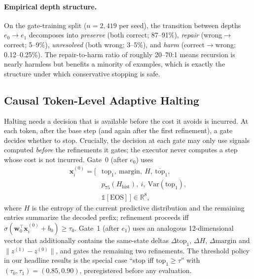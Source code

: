 \documentclass[11pt]{article}
\begin{document}
\paragraph{Empirical depth structure.}
On the gate-training split ($n{=}2{,}419$ per seed), the transition between depths $e_0 \rightarrow e_1$ decomposes into \emph{preserve} (both correct; 87--91\%), \emph{repair} (wrong$\rightarrow$correct; 5--9\%), \emph{unresolved} (both wrong; 3--5\%), and \emph{harm} (correct$\rightarrow$wrong; 0.12--0.25\%). The repair-to-harm ratio of roughly 20--70:1 means recursion is nearly harmless but benefits a minority of examples, which is exactly the structure under which conservative stopping is safe.

\subsection{Causal Token-Level Adaptive Halting}
\label{sec:halting}
Halting needs a decision that is available before the cost it avoids is incurred. At each token, after the base step (and again after the first refinement), a gate decides whether to stop. Crucially, the decision at each gate may only use signals computed \emph{before} the refinements it gates; the executor never computes a step whose cost is not incurred. Gate~0 (after $e_0$) uses
\begin{equation}
\begin{aligned}
\mathbf{x}^{(0)}_i = \big[ &\mathrm{top}_1,\ \mathrm{margin},\ H,\ \overline{\mathrm{top}}_1,\\
 &p_{75}(H_{\mathrm{hist}}),\ i,\ \mathrm{Var}(\mathrm{top}_1),\\
 &\mathbb{1}[\mathrm{EOS}]\,\big] \in \mathbb{R}^8,
\end{aligned}
\label{eq:gate0}
\end{equation}
where $H$ is the entropy of the current predictive distribution and the remaining entries summarize the decoded prefix; refinement proceeds iff $\sigma(\mathbf{w}_0^\top \mathbf{x}^{(0)}_i + b_0) \geq \tau_0$. Gate~1 (after $e_1$) uses an analogous 12-dimensional vector that additionally contains the same-state deltas $\Delta\mathrm{top}_1$, $\Delta H$, $\Delta\mathrm{margin}$ and $\lVert z^{(1)}-z^{(0)}\rVert$, and gates the remaining two refinements. The threshold policy in our headline results is the special case ``stop iff $\mathrm{top}_1 \geq \tau$'' with $(\tau_0,\tau_1)=(0.85,0.90)$, preregistered before any evaluation.
\end{document}

